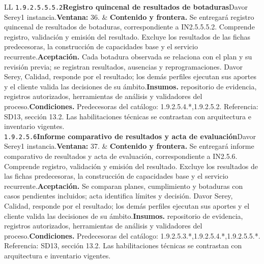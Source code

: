 \begin{longtable}{L{\tabcolsep\relax}L{\tabcolsep\relax}}
\texttt{1.\allowbreak{}9.\allowbreak{}2.\allowbreak{}5.\allowbreak{}5.\allowbreak{}5.\allowbreak{}2}\newline{}\textbf{Registro quincenal de resultados de botaduras}\newline{}Davor Serey\newline{}1 instancia.\newline{}\textbf{Ventana:} 36. & \textbf{Contenido y frontera.} Se entregará registro quincenal de resultados de botaduras, correspondiente a IN2.5.5.5.2. Comprende registro, validación y emisión del resultado. Excluye los resultados de las fichas predecesoras, la construcción de capacidades base y el servicio recurrente.\newline{}\textbf{Aceptación.} Cada botadura observada se relaciona con el plan y su revisión previa; se registran resultados, ausencias y reprogramaciones. Davor Serey, Calidad, responde por el resultado; los demás perfiles ejecutan sus aportes y el cliente valida las decisiones de su ámbito.\newline{}\textbf{Insumos.} repositorio de evidencia, registros autorizados, herramientas de análisis y validadores del proceso.\newline{}\textbf{Condiciones.} Predecesoras del catálogo: 1.9.2.5.4.*,1.9.2.5.2. Referencia: SD13, sección 13.2. Las habilitaciones técnicas se contrastan con arquitectura e inventario vigentes.\\\hline
\texttt{1.\allowbreak{}9.\allowbreak{}2.\allowbreak{}5.\allowbreak{}6}\newline{}\textbf{Informe comparativo de resultados y acta de evaluación}\newline{}Davor Serey\newline{}1 instancia.\newline{}\textbf{Ventana:} 37. & \textbf{Contenido y frontera.} Se entregará informe comparativo de resultados y acta de evaluación, correspondiente a IN2.5.6. Comprende registro, validación y emisión del resultado. Excluye los resultados de las fichas predecesoras, la construcción de capacidades base y el servicio recurrente.\newline{}\textbf{Aceptación.} Se comparan planes, cumplimiento y botaduras con casos pendientes incluidos; acta identifica límites y decisión. Davor Serey, Calidad, responde por el resultado; los demás perfiles ejecutan sus aportes y el cliente valida las decisiones de su ámbito.\newline{}\textbf{Insumos.} repositorio de evidencia, registros autorizados, herramientas de análisis y validadores del proceso.\newline{}\textbf{Condiciones.} Predecesoras del catálogo: 1.9.2.5.3.*,1.9.2.5.4.*,1.9.2.5.5.*. Referencia: SD13, sección 13.2. Las habilitaciones técnicas se contrastan con arquitectura e inventario vigentes.\\\hline

\end{longtable}
